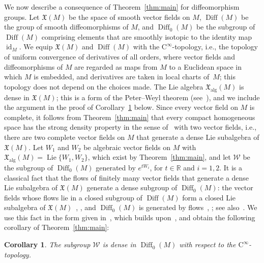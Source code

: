 \documentclass{article}
\newcommand{\R}{\mathbb{R}}
\newcommand{\xalg}{\mathfrak X_{\mathrm{alg}}}
\theoremstyle{definition}
\theoremstyle{plain}
\newtheorem{maincor}{Corollary}
\begin{document}
We now describe a consequence of Theorem~\ref{thm:main} for diffeomorphism groups.
Let $\mathfrak X(M)$ be the space of smooth vector fields on $M$, $\operatorname{Diff}(M)$ be the group of smooth diffeomorphisms of $M$, and $\operatorname{Diff}_0(M)$ be the subgroup of $\operatorname{Diff}(M)$ comprising elements that are smoothly isotopic to the identity map $\operatorname{id}_M$.
We equip $\mathfrak X(M)$ and $\operatorname{Diff}(M)$ with the $\mathrm{C}^\infty$-topology, i.e., the topology of uniform convergence of derivatives of all orders, where vector fields and diffeomorphisms of $M$ are regarded as maps from $M$ to a Euclidean space in which $M$ is embedded, and derivatives are taken in local charts of~$M$; this topology does not depend on the choices made.
The Lie algebra $\xalg(M)$ is dense in $\mathfrak X(M)$; this is a form of the Peter--Weyl theorem (see~\cite[p.~1205]{Luk75Izv}), and we include the argument in the proof of Corollary~\ref{cor:B} below.
 Since every vector field on $M$ is complete, it follows from Theorem~\ref{thm:main} that every compact homogeneous space has the strong density property in the sense of~\cite{CofD3gen} with two vector fields, i.e., there are two complete vector fields on $M$ that generate a dense Lie subalgebra of $\mathfrak X(M)$.
 Let $W_1$ and $W_2$ be algebraic vector fields on $M$ with $\xalg(M)=\operatorname{Lie}\{W_1,W_2\}$, which exist by Theorem~\ref{thm:main}, and let $\mathcal W$ be the subgroup of $\operatorname{Diff}_0(M)$ generated by $e^{tW_i}$, for $t\in\R$ and $i=1,2$.
It is a classical fact that the flows of finitely many vector fields that generate a dense Lie subalgebra of $\mathfrak X(M)$ generate a dense subgroup of $\operatorname{Diff}_0(M)$: 
the vector fields whose flows lie in a closed subgroup of $\operatorname{Diff}(M)$ form a closed Lie subalgebra of $\mathfrak X(M)$~\cite[Theorem~1]{Luk74}, \cite[Corollary~1]{Luk81}, and $\operatorname{Diff}_0(M)$ is generated by flows~\cite{Thurston74}, \cite[Corollary~2]{Luk81}; see also~\cite[Theorem~2.5]{Varolin01}.
We use this fact in the form given in~\cite[Theorem~1 and Remark~1]{AK26}, which builds upon~\cite{AS20},
    and obtain the following corollary of Theorem~\ref{thm:main}:

\begin{maincor}\label{cor:B}
The subgroup $\mathcal W$ is dense in $\operatorname{Diff}_0(M)$ with respect to the $\mathrm{C}^\infty$-topology.
\end{maincor}
\end{document}
